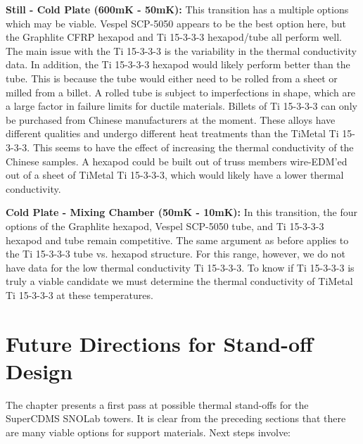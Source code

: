 \documentclass{report}
\begin{document}
\smallskip

\textbf{Still - Cold Plate (600mK - 50mK):} This transition has a multiple options which may be viable. Vespel SCP-5050 appears to be the best option here, but the Graphlite CFRP hexapod and Ti 15-3-3-3 hexapod/tube all perform well. The main issue with the Ti 15-3-3-3 is the variability in the thermal conductivity data. In addition, the Ti 15-3-3-3 hexapod would likely perform better than the tube. This is because the tube would either need to be rolled from a sheet or milled from a billet. A rolled tube is subject to imperfections in shape, which are a large factor in failure limits for ductile materials. Billets of Ti 15-3-3-3 can only be purchased from Chinese manufacturers at the moment. These alloys have different qualities and undergo different heat treatments than the TiMetal Ti 15-3-3-3. This seems to have the effect of increasing the thermal conductivity of the Chinese samples. A hexapod could be built out of truss members wire-EDM'ed out of a sheet of TiMetal Ti 15-3-3-3, which would likely have a lower thermal conductivity.
\smallskip

\textbf{Cold Plate - Mixing Chamber (50mK - 10mK):} In this transition, the four options of the Graphlite hexapod, Vespel SCP-5050 tube, and Ti 15-3-3-3 hexapod and tube remain competitive. The same argument as before applies to the Ti 15-3-3-3 tube vs. hexapod structure. For this range, however, we do not have data for the low thermal conductivity Ti 15-3-3-3. To know if Ti 15-3-3-3 is truly a viable candidate we must determine the thermal conductivity of TiMetal Ti 15-3-3-3 at these temperatures.

\section{Future Directions for Stand-off Design}

The chapter presents a first pass at possible thermal stand-offs for the SuperCDMS SNOLab towers. It is clear from the preceding sections that there are many viable options for support materials. Next steps involve:
\end{document}
